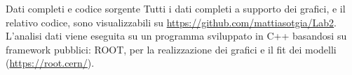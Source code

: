 \documentclass[
    rmp,
    floatfix,
    reprint, 
    superscriptaddress, 
    altaffilletter, 
    amsmath, 
    amssymb, 
    a4paper]{revtex4-2}
\begin{document}






\begin{methods}{D\lowercase{ati completi e codice sorgente}}
    Tutti i dati completi a supporto dei grafici, e il relativo codice, sono visualizzabili su \url{https://github.com/mattiasotgia/Lab2}. L'analisi dati viene eseguita su un programma sviluppato in C++ basandosi su framework pubblici: ROOT, per la realizzazione dei grafici e il fit dei modelli (\url{https://root.cern/}).
\end{methods}


\appendix

\renewcommand{\thetable}{S-\arabic{table}}

\end{document}
